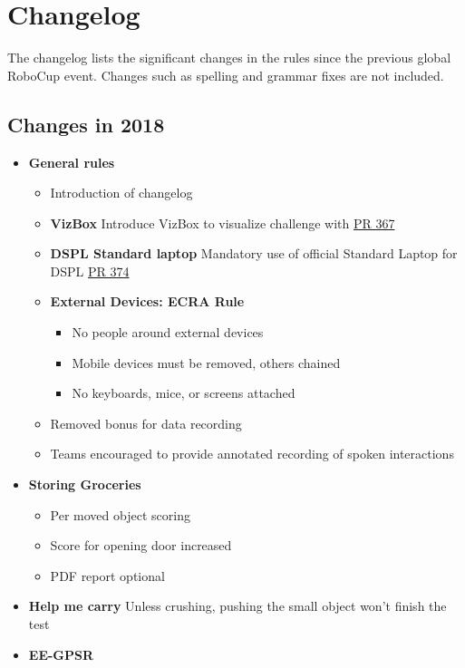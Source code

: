 \section*{Changelog}
The changelog lists the significant changes in the rules since the previous global RoboCup event. 
Changes such as spelling and grammar fixes are not included. 
\subsection*{Changes in 2018}

\begin{itemize}
	\item \textbf{General rules}
		\begin{itemize}
			\item Introduction of changelog
			\item \textbf{VizBox} Introduce VizBox to visualize challenge with \href{https://github.com/RoboCupAtHome/RuleBook/pull/367}{PR 367}
			\item \textbf{DSPL Standard laptop} Mandatory use of official Standard Laptop for DSPL \href{https://github.com/RoboCupAtHome/RuleBook/pull/374}{PR 374}
			\item \textbf{External Devices: ECRA Rule}
				\begin{itemize}
					\item No people around external devices
					\item Mobile devices must be removed, others chained
					\item No keyboards, mice, or screens attached
				\end{itemize}
			\item Removed bonus for data recording
			\item Teams encouraged to provide annotated recording of spoken interactions
		\end{itemize}
	\item \textbf{Storing Groceries}
	\begin{itemize}
		\item Per moved object scoring
		\item Score for opening door increased
		\item PDF report optional
	\end{itemize}
	\item \textbf{Help me carry} Unless crushing, pushing the small object won't finish the test
	\item \textbf{EE-GPSR}
		\begin{itemize}

\end{itemize}
\end{itemize}
